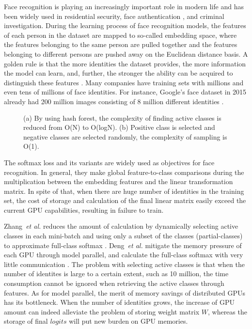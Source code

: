 \documentclass[letterpaper]{article} \usepackage{style/aaai21}  \usepackage{times}  \usepackage{helvet} \usepackage{courier}  \usepackage[hyphens]{url}  \usepackage{graphicx} \usepackage{color}
\begin{document}
Face recognition is playing an increasingly important role in modern life and has been widely used in residential security, face authentication \cite{wang2015face}, and criminal investigation. During the learning process of face recognition models, the features of each person in the dataset are mapped to so-called embedding space, where the features belonging to the same person are pulled together and the features belonging to different persons are pushed away on the Euclidean distance basis. A golden rule is that the more identities the dataset provides, the more information the model can learn, and, further, the stronger the ability can be acquired to distinguish these features \cite{cao2018celeb,deng2019arcface}. Many companies have training sets with millions and even tens of millions of face identities. For instance, Google’s face dataset in 2015 already had 200 million images consisting of 8 million different identities \cite{schroff2015facenet}.
\begin{figure}[t]
	\centering
	\caption{ (a) By using hash forest, the complexity of finding active classes is reduced from O(N) to O(logN). (b) Positive class is selected and negative classes are selected randomly, the complexity of sampling is O(1).}
	\label{fig1}
\end{figure}


The softmax loss and its variants \cite{wang2018cosface,deng2019arcface,wang2018additive,liu2017sphereface} are widely used as objectives for face recognition. In general, they make global feature-to-class comparisons during the multiplication between the embedding features and the linear transformation matrix. In spite of that, when there are huge number of identities in the training set, the cost of storage and calculation of the final linear matrix easily exceed the current GPU capabilities, resulting in failure to train.
  
Zhang~\emph{et al.} reduces the amount of calculation by dynamically selecting active classes in each mini-batch and using only a subset of the classes (partial-classes) to approximate full-class softmax \cite{zhang2018accelerated}. Deng~\emph{et al.}  mitigate the memory pressure of each GPU through model parallel, and calculate the full-class softmax with very little communication \cite{deng2019arcface}. The problem with selecting active classes is that when the number of identites is large to a certain extent, such as 10 million, the time consumption cannot be ignored when retrieving the active classes through features. As for model parallel, the merit of memory savings of distributed GPUs has its bottleneck. When the number of identities grows, the increase of GPU amount can indeed alleviate the problem of storing weight matrix $W$, whereas the storage of final $logits$ will put new burden on GPU memories.
\end{document}

